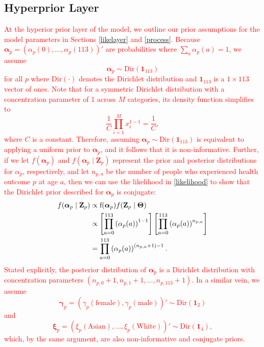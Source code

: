 \documentclass[final]{statsoc}
\begin{document}
\subsection{Hyperprior Layer}
\textcolor{red}{At the hyperior prior layer of the model, we outline our prior assumptions for the model
parameters in Sections \ref{likelayer} and \ref{process}. Because $\boldsymbol{\alpha}_p = 
(\alpha_p(0),\dots,\alpha_p(113))'$ are probabilities where $\sum_a \alpha_p(a) = 1$, 
we assume $$\boldsymbol{\alpha}_{p} \sim \text{Dir}(\mathbf{1}_{113})$$ for all $p$ where 
$\text{Dir}(\cdot)$ denotes the Dirichlet distribution and $\mathbf{1}_{113}$ is a $1\times 113$ vector of ones. Note that for a symmetric Dirichlet distribution with a concentration parameter of 1 across $M$ categories, its density function simplifies to 
\begin{equation}
\frac{1}{C}\prod_{i=1}^M x_i^{1 - 1} = \frac{1}{C},
\end{equation}
where $C$ is a constant. Therefore, assuming $\boldsymbol\alpha_p \sim \text{Dir}(\mathbf{1}_{113})$ is equivalent to applying a uniform prior to $\boldsymbol\alpha_p$, and it follows that it is non-informative. Further, if we let $f(\boldsymbol\alpha_p)$ and $f(\boldsymbol\alpha_p \mid \mathbf{Z}_p)$ represent the prior and posterior distributions for $\alpha_p$, respectively, and let $n_{p,a}$ be the number of people who experienced health outcome $p$ at age $a$, then we can use the likelihood in \eqref{likelihood} to show that the Dirichlet prior described for $\boldsymbol{\alpha}_p$ is conjugate:  
\begin{align}
f(\boldsymbol{\alpha}_p \mid \mathbf{Z}_p) &\propto \text{f}(\boldsymbol{\alpha}_p)f(\mathbf{Z}_p \mid \boldsymbol\Theta) \notag \\
&\propto \left[\prod_{a=0}^{113}\left(\alpha_p(a)\right)^{1-1}\right]\left[\prod_{a=0}^{113} \left(\alpha_p(a)\right)^{n_{p,a}}\right]  \label{apost} \\
&= \prod_{a=0}^{113} \left(\alpha_p(a)\right)^{(n_{p,a}+1)-1}. \notag
\end{align} 
Stated explicitly, the posterior distribution of $\boldsymbol\alpha_p$ is a Dirichlet distribution with concentration parameters $(n_{p,0} + 1, n_{p,1} + 1, \dots, n_{p,113}+1)$.
In a similar vein, we assume $$\boldsymbol\gamma_p = (\gamma_p(\text{female}), \gamma_p(\text{male}))' \sim \text{Dir}(\mathbf{1}_2)$$ and $$\boldsymbol\xi_p = (\xi_p(\text{Asian}), \dots, \xi_p(\text{White}))' \sim \text{Dir}(\mathbf{1}_4),$$ which, by the same argument, are also non-informative and conjugate priors.}
\end{document}
